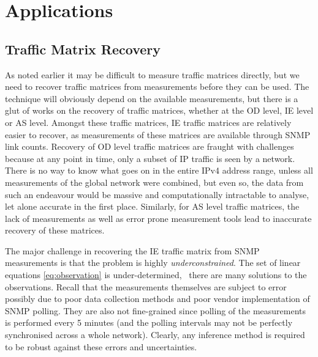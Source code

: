 \clearpage
\section{Applications}
\label{sec:applications}

\subsection{Traffic Matrix Recovery}

As noted earlier it may be difficult to measure traffic matrices
directly, but we need to recover traffic matrices from measurements
before they can be used. The technique will obviously depend on the
available measurements, but there is a glut of works on the recovery
of traffic matrices, whether at the OD level, IE level or AS
level. Amongst these traffic matrices, IE traffic matrices are
relatively easier to recover, as measurements of these matrices are
available through SNMP link counts. Recovery of OD level traffic
matrices are fraught with challenges because at any point in time,
only a subset of IP traffic is seen by a network. There is no way to
know what goes on in the entire IPv4 address range, 
unless all measurements of the
global network were combined, but even so, the data from such an
endeavour would be massive and computationally intractable to
analyse, let alone accurate in the first place. Similarly, for AS level 
traffic matrices, the lack of measurements as well as error prone 
measurement tools lead to inaccurate recovery of these matrices.

The major challenge in recovering the IE traffic matrix from SNMP
measurements is that the problem is highly \emph{underconstrained}.
The set of linear equations \autoref{eq:observation} is
under-determined, \ie~there are many solutions to the
observations. Recall that the measurements themselves are subject to
error possibly due to poor data collection methods and poor vendor
implementation of SNMP polling.  They are also not fine-grained since
polling of the measurements is performed every 5 minutes (and the
polling intervals may not be perfectly synchronised across a whole
network). Clearly, any inference method is required to be robust
against these errors and uncertainties. 

